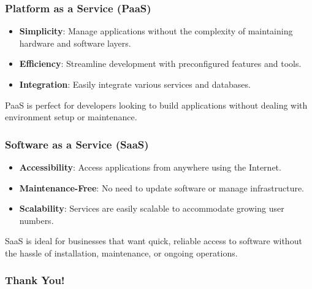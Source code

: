 \documentclass{beamer}
\begin{document}
\begin{frame}
    \frametitle{Platform as a Service (PaaS)}
    \vspace{10pt}
    \begin{itemize}
        \item\textbf{Simplicity}: Manage applications without the complexity of maintaining hardware and software layers.
        \item\textbf{Efficiency}: Streamline development with preconfigured features and tools.
        \item\textbf{Integration}: Easily integrate various services and databases.
    \end{itemize}
    \vspace{10pt}
    PaaS is perfect for developers looking to build applications without dealing with environment setup or maintenance.
\end{frame}

\begin{frame}
    \frametitle{Software as a Service (SaaS)}
    \vspace{10pt}
    \begin{itemize}
        \item\textbf{Accessibility}: Access applications from anywhere using the Internet.
        \item\textbf{Maintenance{-}Free}: No need to update software or manage infrastructure.
        \item\textbf{Scalability}: Services are easily scalable to accommodate growing user numbers.
    \end{itemize}
    \vspace{10pt}
    SaaS is ideal for businesses that want quick, reliable access to software without the hassle of installation, maintenance, or ongoing operations.
\end{frame}

\begin{frame}
    \frametitle{Thank You!}
\end{frame}
\end{document}
